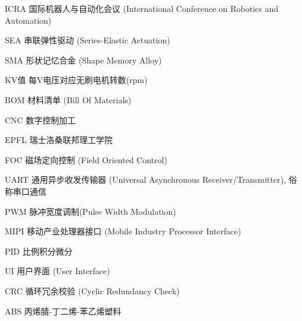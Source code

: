 
\begin{denotation}[3cm]
\item[ICRA] 国际机器人与自动化会议 (International Conference on Robotics and Automation)
\item[SEA] 串联弹性驱动 (Series-Elastic Actuation)
\item[SMA] 形状记忆合金 (Shape Memory Alloy)
\item[KV值] 每V电压对应无刷电机转数(rpm)
\item[BOM] 材料清单 (Bill Of Materials) 
\item[CNC] 数字控制加工
\item[EPFL] 瑞士洛桑联邦理工学院 
\item[FOC] 磁场定向控制 (Field Oriented Control)
\item[UART] 通用异步收发传输器 (Universal Asynchronous Receiver/Transmitter), 俗称串口通信
\item[PWM] 脉冲宽度调制(Pulse Width Modulation)
\item[MIPI] 移动产业处理器接口 (Mobile Industry Processor Interface) 
\item[PID] 比例积分微分
\item[UI] 用户界面 (User Interface) 
\item[CRC] 循环冗余校验 (Cyclic Redundancy Check)
\item[ABS] 丙烯腈-丁二烯-苯乙烯塑料 
\end{denotation}
 

